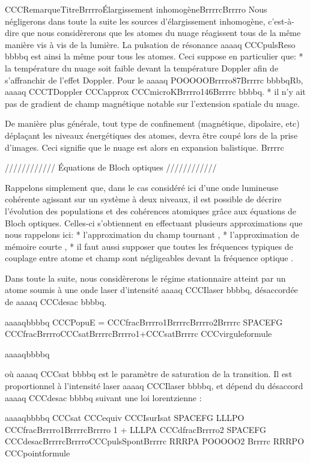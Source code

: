 CCCRemarqueTitreBrrrroÉlargissement inhomogèneBrrrrcBrrrro
Nous négligerons dans toute la suite les sources d'élargissement inhomogène, c'est-à-dire que nous considèrerons que les atomes du nuage réagissent tous de la même manière vis à vis de la lumière. La pulsation de résonance aaaaq CCCpulsReso bbbbq est ainsi la même pour tous les atomes. Ceci suppose en particulier que:
	* la température du nuage soit faible devant la température Doppler afin de s'affranchir de l'effet Doppler.	Pour le aaaaq POOOOOBrrrro87Brrrrc bbbbqRb, aaaaq CCCTDoppler CCCapprox CCCmicroKBrrrro146Brrrrc bbbbq.
	* il n'y ait pas de gradient de champ magnétique notable sur l'extension spatiale du nuage.

De manière plus générale, tout type de confinement (magnétique, dipolaire, etc) déplaçant les niveaux énergétiques des atomes, devra être coupé lors de la prise d'images. Ceci signifie que le nuage est alors en expansion balistique.
Brrrrc



//////////// Équations de Bloch optiques ////////////

Rappelons simplement que, dans le cas considéré ici d'une onde lumineuse cohérente agissant sur un système à deux niveaux, il est possible de décrire l'évolution des populations et des cohérences atomiques grâce aux équations de Bloch optiques. Celles-ci s'obtiennent en effectuant plusieurs approximations que nous rappelons ici:
	* l'approximation du champ tournant
		,
	* l'approximation de mémoire courte
		,
	* il faut aussi supposer que toutes les fréquences typiques de couplage entre atome et champ sont négligeables devant la fréquence optique
	.

Dans toute la suite, nous considèrerons le régime stationnaire
 atteint par un atome soumis à une onde laser d'intensité aaaaq CCCIlaser bbbbq, désaccordée de aaaaq CCCdesac bbbbq.  



aaaaqbbbbq
	CCCPopuE = CCCfracBrrrro1BrrrrcBrrrro2Brrrrc SPACEFG CCCfracBrrrroCCCsatBrrrrcBrrrro1+CCCsatBrrrrc
	CCCvirguleformule
	
aaaaqbbbbq



où aaaaq CCCsat bbbbq est le paramètre de saturation de la transition. Il est proportionnel à l'intensité laser aaaaq CCCIlaser bbbbq, et dépend du désaccord aaaaq CCCdesac bbbbq suivant une loi lorentzienne :



aaaaqbbbbq
	CCCsat CCCequiv CCCIsurIsat  
	 SPACEFG   LLLPO  CCCfracBrrrro1BrrrrcBrrrro 1 +  LLLPA CCCdfracBrrrro2 SPACEFG CCCdesacBrrrrcBrrrroCCCpulsSpontBrrrrc RRRPA POOOOO2 Brrrrc  RRRPO  
	CCCpointformule
	
